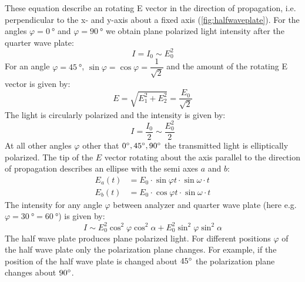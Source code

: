 \documentclass{article}
\begin{document}
These equation describe an rotating E vector in the direction 
of propagation, i.e. perpendicular to the x- and y-axis about a 
fixed axis (\ref{fig:halfwaveplate}). For the angles $\varphi = \SI{0}{\degree}$ and $\varphi = \SI{90}{\degree}$ we obtain plane polarized 
light intensity after the quarter wave plate:
\begin{equation}
    I = I_0 \sim E_0^2
\end{equation}
For an angle $\varphi = \SI{45}{\degree}$, $\sin \varphi = \cos \varphi = \dfrac{1}{\sqrt{2}}$ and the amount of  the rotating E vector is given by:
\begin{equation}
    E = \sqrt{E_1^2 + E_2^2} = \dfrac{E_0}{\sqrt{2}}
\end{equation}
The light is circularly polarized and the intensity is given by:
\begin{equation}
    I = \dfrac{I_0}{2} \sim \dfrac{E_0^2}{2}
\end{equation}
At all other angles $\varphi$ other that $0 \degree, 45 \degree, 90 \degree$ the transmitted 
light is elliptically polarized. The tip of the $E$ vector rotating 
about the axis parallel to the direction of propagation describes an ellipse with the semi axes $a$ and $b$:
\begin{equation}
    \begin{split}
        E_a (t) 
        &= E_0 \cdot \sin \varphi t \cdot \sin \omega \cdot t \\
        E_b (t)
        &= E_0 \cdot \cos \varphi t \cdot \sin \omega \cdot t
    \end{split}
\end{equation}
The intensity for any angle $\varphi$ between analyzer and quarter 
wave plate (here e.g. $\varphi = \SI{30}{\degree} = \SI{60}{\degree}$) is given by: 
\begin{equation}
    I \sim E_0^2 \cos^2 \varphi \cos^2 \alpha + E_0^2 \sin^2 \varphi \sin^2 \alpha
\end{equation}
The half wave plate produces plane polarized light. For different positions $\varphi$ of the half wave plate only the polarization 
plane changes. For example, if the position of the half wave 
plate is changed about $45 \degree$ the polarization plane changes 
about $90 \degree$. 
\end{document}
